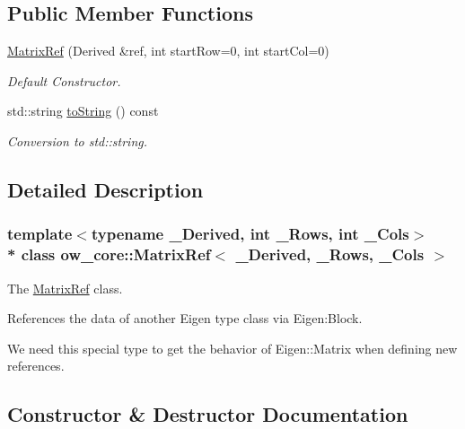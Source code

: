 \subsection*{Public Member Functions}
\begin{DoxyCompactItemize}
\item 
\hyperlink{classow__core_1_1MatrixRef_aba4840a8e3d79c599a3390d6c64790af}{Matrix\+Ref} (Derived \&ref, int start\+Row=0, int start\+Col=0)
\begin{DoxyCompactList}\small\item\em Default Constructor. \end{DoxyCompactList}\item 
std\+::string \hyperlink{classow__core_1_1MatrixRef_af123840b0aeea5385866934a44998eef}{to\+String} () const 
\begin{DoxyCompactList}\small\item\em Conversion to std\+::string. \end{DoxyCompactList}\end{DoxyCompactItemize}


\subsection{Detailed Description}
\subsubsection*{template$<$typename \+\_\+\+Derived, int \+\_\+\+Rows, int \+\_\+\+Cols$>$\\*
class ow\+\_\+core\+::\+Matrix\+Ref$<$ \+\_\+\+Derived, \+\_\+\+Rows, \+\_\+\+Cols $>$}

The \hyperlink{classow__core_1_1MatrixRef}{Matrix\+Ref} class. 

References the data of another Eigen type class via Eigen\+:Block.

We need this special type to get the behavior of Eigen\+::\+Matrix when defining new references. 

\subsection{Constructor \& Destructor Documentation}
